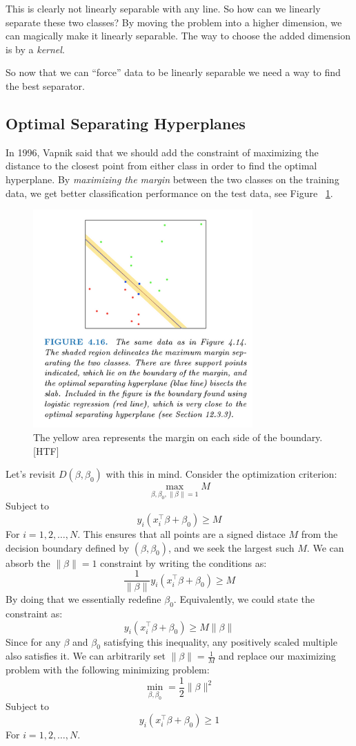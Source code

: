 \documentclass[a4paper]{article}
\begin{document}
This is clearly not linearly separable with any line. So how can we linearly separate these two classes? By moving the problem into a higher dimension, we can magically make it linearly separable. The way to choose the added dimension is by a \textit{kernel}.

So now that we can ``force'' data to be linearly separable we need a way to find the best separator.

\subsection{Optimal Separating Hyperplanes}
In 1996, Vapnik said that we should add the constraint of maximizing the distance to the closest point from either class in order to find the optimal hyperplane. By \textit{maximizing the margin} between the two classes on the training data, we get better classification performance on the test data, see Figure ~\ref{fig:416}.\\

\begin{figure}
\centering
\includegraphics[width=0.75\textwidth]{fig416.png}
\caption{\label{fig:416}The yellow area represents the margin on each side of the boundary. [HTF]}
\end{figure}

Let's revisit $D(\beta,\beta_0)$ with this in mind. Consider the optimization criterion:
$$\max_{\beta,\beta_0,\|\beta\|=1} M$$
Subject to $$y_i(x_i^\top\beta+\beta_0)\geq M$$
For $i=1,2,\ldots,N$. This ensures that all points are a signed distace $M$ from the decision boundary defined by $(\beta,\beta_0)$, and we seek the largest such $M$. We can absorb the $\|\beta\|=1$ constraint by writing the conditions as:
$$\frac{1}{\|\beta\|}y_i(x_i^\top\beta+\beta_0)\geq M$$
By doing that we essentially redefine $\beta_0$. Equivalently, we could state the constraint as:
$$y_i(x_i^\top\beta+\beta_0)\geq M\|\beta\|$$
Since for any $\beta$ and $\beta_0$ satisfying this inequality, any positively scaled multiple also satisfies it. We can arbitrarily set $\|\beta\|=\frac{1}{M}$ and replace our maximizing problem with the following minimizing problem:
$$\min_{\beta,\beta_0}=\frac{1}{2}\|\beta\|^2$$
Subject to $$y_i(x_i^\top\beta+\beta_0)\geq 1$$
For $i=1,2,\ldots,N$.
\end{document}

